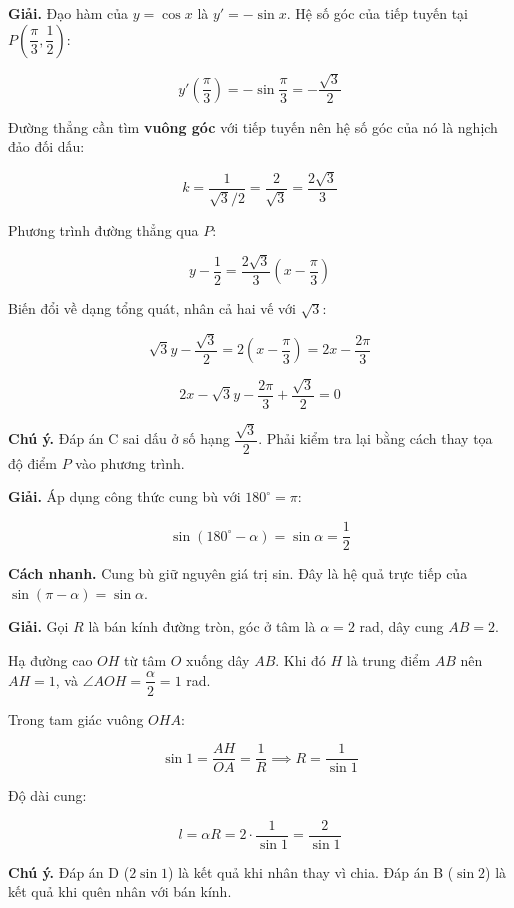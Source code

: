 \documentclass[11pt, a4paper]{article}
\begin{document}
\begin{dapan}[13 — Đáp án A]
\textbf{Giải.} Đạo hàm của $y = \cos x$ là $y' = -\sin x$. Hệ số góc của tiếp tuyến tại $P\left(\dfrac{\pi}{3}, \dfrac{1}{2}\right)$:

$$y'\!\left(\frac{\pi}{3}\right) = -\sin\frac{\pi}{3} = -\frac{\sqrt{3}}{2}$$

Đường thẳng cần tìm \textbf{vuông góc} với tiếp tuyến nên hệ số góc của nó là nghịch đảo đối dấu:

$$k = \frac{1}{\sqrt{3}/2} = \frac{2}{\sqrt{3}} = \frac{2\sqrt{3}}{3}$$

Phương trình đường thẳng qua $P$:

$$y - \frac{1}{2} = \frac{2\sqrt{3}}{3}\left(x - \frac{\pi}{3}\right)$$

Biến đổi về dạng tổng quát, nhân cả hai vế với $\sqrt{3}$:

$$\sqrt{3}y - \frac{\sqrt{3}}{2} = 2\left(x - \frac{\pi}{3}\right) = 2x - \frac{2\pi}{3}$$

$$2x - \sqrt{3}y - \frac{2\pi}{3} + \frac{\sqrt{3}}{2} = 0$$

\textbf{Chú ý.} Đáp án C sai dấu ở số hạng $\dfrac{\sqrt{3}}{2}$. Phải kiểm tra lại bằng cách thay tọa độ điểm $P$ vào phương trình.
\end{dapan}

\begin{dapan}[14 — Đáp án B]
\textbf{Giải.} Áp dụng công thức cung bù với $180^\circ = \pi$:

$$\sin(180^\circ - \alpha) = \sin\alpha = \frac{1}{2}$$

\textbf{Cách nhanh.} Cung bù giữ nguyên giá trị sin. Đây là hệ quả trực tiếp của $\sin(\pi - \alpha) = \sin\alpha$.
\end{dapan}

\begin{dapan}[15 — Đáp án C]
\textbf{Giải.} Gọi $R$ là bán kính đường tròn, góc ở tâm là $\alpha = 2$ rad, dây cung $AB = 2$.

Hạ đường cao $OH$ từ tâm $O$ xuống dây $AB$. Khi đó $H$ là trung điểm $AB$ nên $AH = 1$, và $\angle AOH = \dfrac{\alpha}{2} = 1$ rad.

Trong tam giác vuông $OHA$:

$$\sin 1 = \frac{AH}{OA} = \frac{1}{R} \implies R = \frac{1}{\sin 1}$$

Độ dài cung:

$$l = \alpha R = 2 \cdot \frac{1}{\sin 1} = \frac{2}{\sin 1}$$

\textbf{Chú ý.} Đáp án D ($2\sin 1$) là kết quả khi nhân thay vì chia. Đáp án B ($\sin 2$) là kết quả khi quên nhân với bán kính.
\end{dapan}
\end{document}
